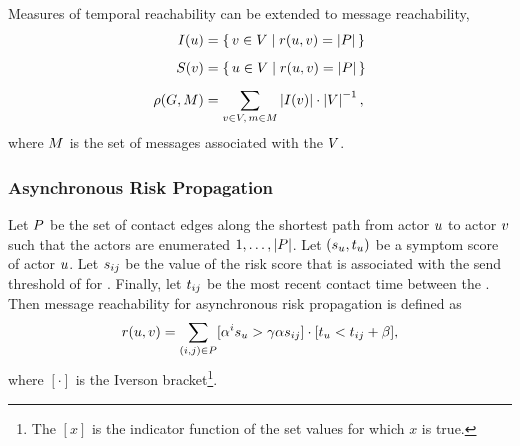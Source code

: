 Measures of temporal reachability can be extended to message reachability,
\begin{align*}
  I(u) &= \set{ v\in V| r(u, v) = \left\vert P\right\vert} \\[5pt]
  S(v) &= \set{ u\in V| r(u, v) = \left\vert P\right\vert} \\[5pt]
  \rho(G, M) &= \sum_{v \in V, \,m \in M} \left\vert I(v) \right\vert \cdot \left\vert V \right\vert^{-1},
\end{align*}
where $M$ is the set of messages associated with the \verticesName $V$.

\subsubsection*{Asynchronous Risk Propagation}

Let $P$ be the set of contact edges along the shortest path from actor $u$ to actor $v$ such that the actors are enumerated $1, \ldots, \left\vert P \right\vert$. Let $(s_u, t_u)$ be a symptom score of actor $u$. Let $s_{ij}$ be the value of the risk score that is associated with the send threshold of  for . Finally, let $t_{ij}$ be the most recent contact time between the . Then message reachability for asynchronous risk propagation is defined as
\begin{equation}\label{eq:message-reachability}
  r(u, v) = \sum_{(i, j) \in P} [\alpha^i s_u > \gamma \alpha s_{ij}] \cdot [t_u < t_{ij} + \beta],
\end{equation}
where $[\cdot]$ is the Iverson bracket\footnote{The  $[x]$ is the indicator function of the set values for which $x$ is true.}.

